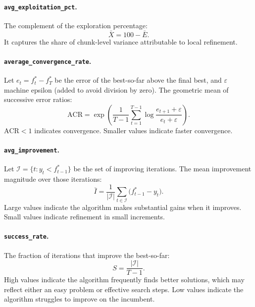 \paragraph{\texttt{avg\_exploitation\_pct}.}
The complement of the exploration percentage:
\begin{equation}
\label{eq:avg_exploit_pct}
  \bar{X} = 100 - \bar{E}.
\end{equation}
It captures the share of chunk-level variance attributable to local refinement.

\paragraph{\texttt{average\_convergence\_rate}.}
Let $e_t = f^*_t - f^*_T$ be the error of the best-so-far above the final best, and $\varepsilon$ machine epsilon (added to avoid division by zero). The geometric mean of successive error ratios:
\begin{equation}
\label{eq:acr}
  \text{ACR} = \exp\!\left( \frac{1}{T-1} \sum_{t=1}^{T-1} \log \frac{e_{t+1} + \varepsilon}{e_t + \varepsilon} \right).
\end{equation}
$\text{ACR} < 1$ indicates convergence. Smaller values indicate faster convergence.

\paragraph{\texttt{avg\_improvement}.}
Let $\mathcal{I} = \{t : y_t < f^*_{t-1}\}$ be the set of improving iterations. The mean improvement magnitude over those iterations:
\begin{equation}
\label{eq:avg_imp}
  \bar{I} = \frac{1}{|\mathcal{I}|} \sum_{t \in \mathcal{I}} \bigl(f^*_{t-1} - y_t\bigr).
\end{equation}
Large values indicate the algorithm makes substantial gains when it improves. Small values indicate refinement in small increments.

\paragraph{\texttt{success\_rate}.}
The fraction of iterations that improve the best-so-far:
\begin{equation}
\label{eq:success_rate}
  S = \frac{|\mathcal{I}|}{T - 1}.
\end{equation}
High values indicate the algorithm frequently finds better solutions, which may reflect either an easy problem or effective search steps. Low values indicate the algorithm struggles to improve on the incumbent.

